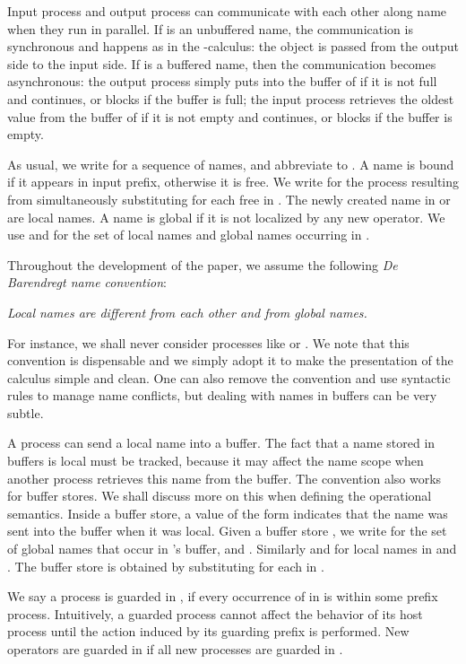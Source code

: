 \documentclass[runningheads, envcountsame, a4paper]{llncs}
\begin{document}
Input process  and output process  can communicate with each other along name  when they run in parallel.
If  is an unbuffered name, the communication is synchronous and happens as in the -calculus: the object  is passed from the
output side to the input side.
If  is a buffered name, then the communication becomes asynchronous: the output process simply puts  into the buffer of 
if it is not full and continues, or blocks if the buffer is full; the input process retrieves the oldest value from the buffer of 
if it is not empty and continues, or blocks if the buffer is empty.

As usual, we write  for a sequence of names, and abbreviate  to .
A name  is bound if it appears in input prefix, otherwise it is free.
We write  for the process resulting from simultaneously substituting  for each free  in .
The newly created name  in  or  are local names. A name is global if it is not localized
by any new operator. We use  and  for the set of local names and global names occurring in .

Throughout the development of the paper, we assume the following {\em De Barendregt name convention}:
\begin{center}{\em Local names are different from each other and from global names.}\end{center}
For instance, we shall never consider processes like   or .
We note that this convention is dispensable and we simply adopt it to make the presentation of the calculus simple and clean.
One can also remove the convention and use syntactic rules to manage name conflicts, but dealing with names in buffers
can be very subtle.

A process can send a local name into a buffer.
The fact that a name stored in buffers is local must be tracked, because it may affect the name scope when another process
retrieves this name from the buffer. The convention also works for buffer stores.
We shall discuss more on this when defining the operational semantics.
Inside a buffer store, a value of the form  indicates that the name  was sent into the buffer when it was local.
Given a buffer store , we write  for the set of global names that occur in 's buffer,
and . Similarly  and  for local names in  and .
The buffer store  is obtained by substituting  for each  in .

We say a process  is guarded in , if every occurrence of  in  is within some prefix process.
Intuitively, a guarded process cannot affect the behavior of its host process until the action induced by its guarding prefix is performed.
New operators are guarded in  if all new processes are guarded in .
\end{document}
